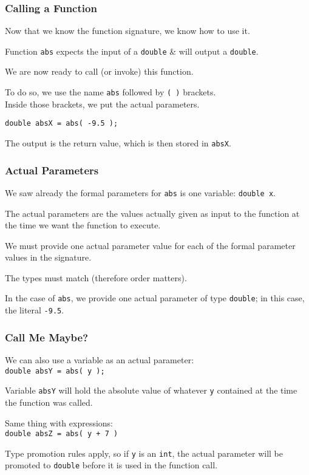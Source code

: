 \begin{frame}
\frametitle{Calling a Function}

Now that we know the function signature, we know how to use it.

Function \texttt{abs} expects the input of a \texttt{double} \& will output a \texttt{double}.

We are now ready to \alert{call} (or \alert{invoke}) this function.

To do so, we use the name \texttt{abs} followed by \texttt{(~)} brackets.\\
\quad Inside those brackets, we put the \alert{actual parameters}.

\texttt{double absX = abs( -9.5 );}

The output is the \alert{return value}, which is then stored in \texttt{absX}.

\end{frame}


\begin{frame}
\frametitle{Actual Parameters}
We saw already the formal parameters for \texttt{abs} is one variable: \texttt{double~x}.

The \alert{actual parameters} are the values actually given as input to the function at the time we want the function to execute.

We must provide one actual parameter value for each of the formal parameter values in the signature. 

The types must match (therefore order matters).

In the case of \texttt{abs}, we provide one actual parameter of type \texttt{double}; in this case, the literal \texttt{-9.5}.

\end{frame}

\begin{frame}
\frametitle{Call Me Maybe?}

We can also use a variable as an actual parameter:\\
\quad \texttt{double absY = abs( y );}

Variable \texttt{absY} will hold the absolute value of whatever \texttt{y} contained at the time the function was called.

Same thing with expressions:\\
\quad \texttt{double absZ = abs( y + 7 )}

Type promotion rules apply, so if \texttt{y} is an \texttt{int}, the actual parameter will be promoted to \texttt{double} before it is used in the function call.



\end{frame}

